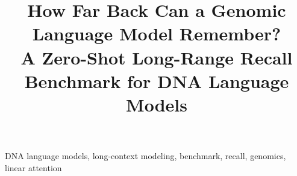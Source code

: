 \documentclass[conference]{IEEEtran}
\begin{document}
\title{How Far Back Can a Genomic Language Model Remember?\\
A Zero-Shot Long-Range Recall Benchmark for DNA Language Models}

\author{
}

\maketitle

\begin{abstract}

\end{abstract}

\begin{IEEEkeywords}
DNA language models, long-context modeling, benchmark, recall, genomics, linear attention
\end{IEEEkeywords}





\end{document}
